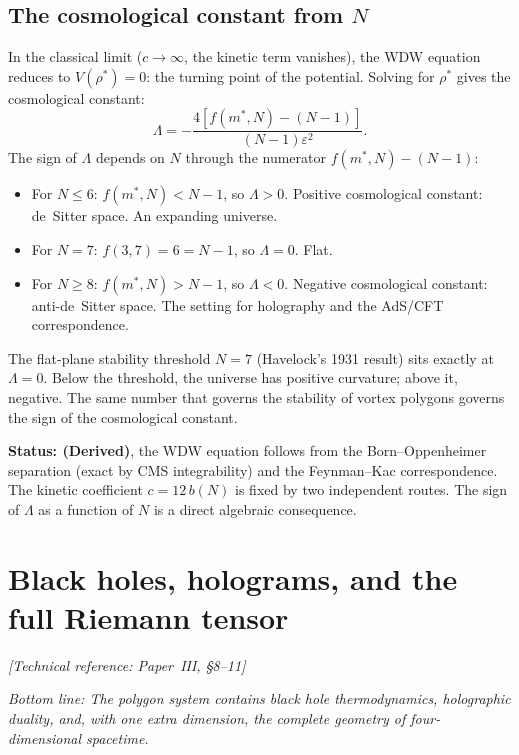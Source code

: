 \subsection*{The cosmological constant from $N$}

In the classical limit ($c \to \infty$, the kinetic term vanishes), the
WDW equation reduces to $V(\rho^*) = 0$: the turning point of the
potential. Solving for $\rho^*$ gives the cosmological constant:
\[
  \Lambda = -\frac{4[f(m^*, N) - (N-1)]}{(N-1)\varepsilon^2}.
\]
The sign of $\Lambda$ depends on $N$ through the numerator
$f(m^*, N) - (N-1)$:

\begin{itemize}
\item For $N \le 6$: $f(m^*, N) < N - 1$, so $\Lambda > 0$.
  Positive cosmological constant: de~Sitter space. An expanding
  universe.
\item For $N = 7$: $f(3, 7) = 6 = N - 1$, so $\Lambda = 0$. Flat.
\item For $N \ge 8$: $f(m^*, N) > N - 1$, so $\Lambda < 0$. Negative
  cosmological constant: anti-de~Sitter space. The setting for
  holography and the AdS/CFT correspondence.
\end{itemize}

The flat-plane stability threshold $N = 7$ (Havelock's 1931 result) sits
exactly at $\Lambda = 0$. Below the threshold, the universe has positive
curvature; above it, negative. The same number that governs the stability
of vortex polygons governs the sign of the cosmological constant.

\textbf{Status: (Derived)}, the WDW equation follows from the
Born--Oppenheimer separation (exact by CMS integrability) and the
Feynman--Kac correspondence. The kinetic coefficient $c = 12\,b(N)$ is
fixed by two independent routes. The sign of $\Lambda$ as a function
of $N$ is a direct algebraic consequence.


\section{Black holes, holograms, and the full Riemann tensor}
\noindent\textit{[Technical reference: Paper~III, \S8--11]}

\medskip

\noindent\textit{Bottom line: The polygon system contains black hole
thermodynamics, holographic duality, and, with one extra
dimension, the complete geometry of four-dimensional spacetime.}

